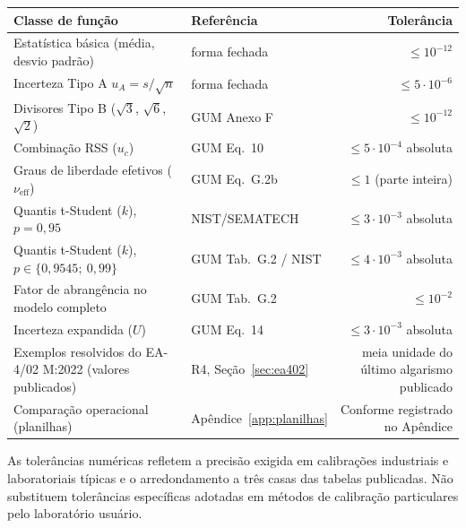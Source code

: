 \documentclass[11pt,a4paper]{article}
\begin{document}
\begin{table}[H]
  \centering
  \small
  \begin{tabularx}{\textwidth}{l X r}
    \toprule
    \textbf{Classe de função} & \textbf{Referência} & \textbf{Tolerância} \\
    \midrule
    Estatística básica (média, desvio padrão)                       & forma fechada          & \(\leq 10^{-12}\) \\
    Incerteza Tipo A \(u_A = s/\sqrt{n}\)                             & forma fechada          & \(\leq 5 \cdot 10^{-6}\) \\
    Divisores Tipo B (\(\sqrt{3}\), \(\sqrt{6}\), \(\sqrt{2}\))      & GUM Anexo F            & \(\leq 10^{-12}\) \\
    Combinação RSS (\(u_c\))                                         & GUM Eq.~10             & \(\leq 5 \cdot 10^{-4}\) absoluta \\
    Graus de liberdade efetivos (\(\nu_\text{eff}\))                 & GUM Eq.~G.2b           & \(\leq 1\) (parte inteira) \\
    Quantis t-Student (\(k\)), \(p = 0{,}95\)                        & NIST/SEMATECH          & \(\leq 3 \cdot 10^{-3}\) absoluta \\
    Quantis t-Student (\(k\)), \(p \in \{0{,}9545;\ 0{,}99\}\)       & GUM Tab.~G.2 / NIST    & \(\leq 4 \cdot 10^{-3}\) absoluta \\
    Fator de abrangência no modelo completo                          & GUM Tab.~G.2           & \(\leq 10^{-2}\) \\
    Incerteza expandida (\(U\))                                      & GUM Eq.~14             & \(\leq 3 \cdot 10^{-3}\) absoluta \\
    Exemplos resolvidos do EA-4/02 M:2022 (valores publicados)       & R4, Seção~\ref{sec:ea402}   & meia unidade do último algarismo publicado \\
    Comparação operacional (planilhas)                               & Apêndice~\ref{app:planilhas} & Conforme registrado no Apêndice \\
    \bottomrule
  \end{tabularx}
\end{table}

As tolerâncias numéricas refletem a precisão exigida em calibrações industriais e laboratoriais típicas e o arredondamento a três casas das tabelas publicadas. Não substituem tolerâncias específicas adotadas em métodos de calibração particulares pelo laboratório usuário.
\end{document}
